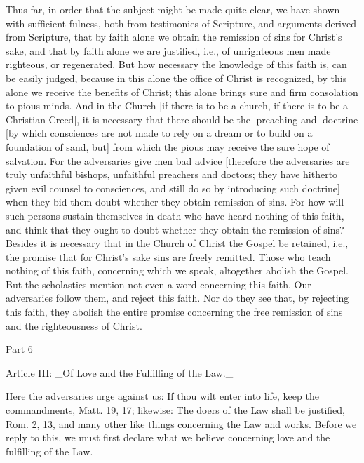 Thus far, in order that the subject might be made quite clear, we
have shown with sufficient fulness, both from testimonies of
Scripture, and arguments derived from Scripture, that by faith alone
we obtain the remission of sins for Christ's sake, and that by faith
alone we are justified, i.e., of unrighteous men made righteous, or
regenerated.  But how necessary the knowledge of this faith is, can
be easily judged, because in this alone the office of Christ is
recognized, by this alone we receive the benefits of Christ; this
alone brings sure and firm consolation to pious minds.  And in the
Church [if there is to be a church, if there is to be a Christian
Creed], it is necessary that there should be the [preaching and]
doctrine [by which consciences are not made to rely on a dream or to
build on a foundation of sand, but] from which the pious may receive
the sure hope of salvation.  For the adversaries give men bad advice
[therefore the adversaries are truly unfaithful bishops, unfaithful
preachers and doctors; they have hitherto given evil counsel to
consciences, and still do so by introducing such doctrine] when they
bid them doubt whether they obtain remission of sins.  For how will
such persons sustain themselves in death who have heard nothing of
this faith, and think that they ought to doubt whether they obtain
the remission of sins?  Besides it is necessary that in the Church of
Christ the Gospel be retained, i.e., the promise that for Christ's
sake sins are freely remitted.  Those who teach nothing of this faith,
concerning which we speak, altogether abolish the Gospel.  But the
scholastics mention not even a word concerning this faith.  Our
adversaries follow them, and reject this faith.  Nor do they see that,
by rejecting this faith, they abolish the entire promise concerning
the free remission of sins and the righteousness of Christ.




Part 6


Article III: _Of Love and the Fulfilling of the Law._

Here the adversaries urge against us: If thou wilt enter into life,
keep the commandments, Matt. 19, 17; likewise: The doers of the Law
shall be justified, Rom. 2, 13, and many other like things concerning
the Law and works.  Before we reply to this, we must first declare
what we believe concerning love and the fulfilling of the Law.


